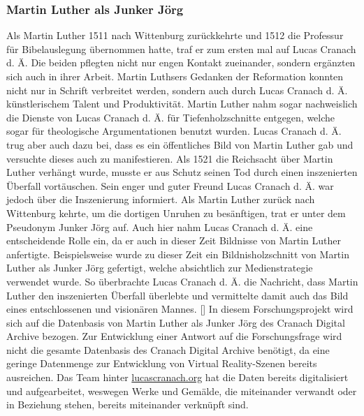 \documentclass[a4paper,12pt,oneside]{article}
\begin{document}
    \subsubsection{Martin Luther als Junker Jörg}
      Als Martin Luther 1511 nach Wittenburg zurückkehrte und 1512 die Professur für
      Bibelauslegung übernommen hatte, traf er zum ersten mal auf Lucas Cranach d. Ä.
      Die beiden pflegten nicht nur engen Kontakt zueinander, sondern ergänzten sich auch
      in ihrer Arbeit. Martin Luthsers Gedanken der Reformation konnten nicht nur in
      Schrift verbreitet werden, sondern auch durch Lucas Cranach d. Ä. künstlerischem
      Talent und Produktivität. Martin Luther nahm sogar nachweislich die Dienste von 
      Lucas Cranach d. Ä. für Tiefenholzschnitte entgegen, welche sogar für
      theologische Argumentationen benutzt wurden. Lucas Cranach d. Ä. trug aber auch
      dazu bei, dass es ein öffentliches Bild von Martin Luther gab und versuchte dieses
      auch zu manifestieren. Als 1521 die Reichsacht über Martin Luther verhängt wurde, 
      musste er aus Schutz seinen Tod durch einen inszenierten Überfall vortäuschen.
      Sein enger und guter Freund Lucas Cranach d. Ä. war jedoch über die Inszenierung 
      informiert. 
      Als Martin Luther zurück nach Wittenburg kehrte, um die dortigen Unruhen zu besänftigen, 
      trat er unter dem Pseudonym \glqq Junker Jörg\grqq{} auf. 
      Auch hier nahm Lucas Cranach d. Ä. eine entscheidende Rolle ein, da er auch in dieser 
      Zeit Bildnisse von Martin Luther anfertigte. 
      Beispielsweise wurde zu dieser Zeit ein Bildnisholzschnitt
      von Martin Luther als Junker Jörg gefertigt, welche absichtlich zur Medienstrategie
      verwendet wurde. So überbrachte Lucas Cranach d. Ä. die Nachricht, dass Martin Luther
      den inszenierten Überfall überlebte und vermittelte damit auch das Bild eines 
      entschlossenen und visionären Mannes. [\cite{heydenreich2017lucas}]
      \newline
      In diesem Forschungsprojekt wird sich auf die Datenbasis von Martin Luther als
      Junker Jörg des Cranach Digital Archive bezogen. Zur Entwicklung einer Antwort auf
      die Forschungsfrage wird nicht die gesamte Datenbasis des Cranach Digital Archive
      benötigt, da eine geringe Datenmenge zur Entwicklung von Virtual Reality-Szenen
      bereits ausreichen. Das Team hinter \url{lucascranach.org} hat die Daten bereits
      digitalisiert und aufgearbeitet, weswegen Werke und Gemälde, die miteinander
      verwandt oder in Beziehung stehen, bereits miteinander verknüpft sind.
\end{document}
